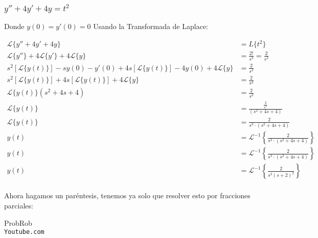 \documentclass[12pt]{report}                                    %
\begin{document}
        \subsubsection{$y''+4y'+4y=t^2$}

            Donde $y(0) = y'(0) = 0$
            Usando la Transformada de Laplace:

            \begin{equation*}   
            \begin{split}
                \mathscr{L}\{ y''+4y'+4y \} &= L\{t^2\}                                                          \\
                \mathscr{L}\{y''\} +4\mathscr{L}\{y'\}+4\mathscr{L}\{y\} &= \frac{2!}{s^3} = \frac{2}{s^3}       \\
                s^2[\mathscr{L}\{y(t)\}] -sy(0) -y'(0)+4s[\mathscr{L}\{y(t)\}] -4y(0)+4\mathscr{L}\{y\} 
                                                                        &= \frac{2}{s^3}                         \\
                s^2[\mathscr{L}\{y(t)\}] +4s[\mathscr{L}\{y(t)\}]+4\mathscr{L}\{y\} &= \frac{2}{s^3}             \\
                \mathscr{L}\{y(t)\} (s^2+4s+4) &= \frac{2}{s^3}                                                  \\
                \mathscr{L}\{y(t)\}  &= \frac{\frac{2}{s^3}}{(s^2+4s+4)}                                         \\
                \mathscr{L}\{y(t)\}  &= \frac{2}{s^3 \cdot (s^2+4s+4)}                                           \\
                y(t)  &= \mathscr{L}^{-1} \left\{ \frac{2}{s^3 \cdot (s^2+4s+4)} \right\}                        \\
                y(t)  &= \mathscr{L}^{-1} \left\{ \frac{2}{s^3 \cdot (s^2+4s+4)} \right\}                        \\
                y(t)  &= \mathscr{L}^{-1} \left\{ \frac{2}{s^3(s+2)^2} \right\}                                  \\
            \end{split}
            \end{equation*}


            Ahora hagamos un paréntesis, tenemos ya solo que resolver esto por fracciones parciales:

            
\clearpage

	\begin{thebibliography}{9}

		ProbRob
		\\\texttt{Youtube.com}


	 

\end{thebibliography}
\end{document}
